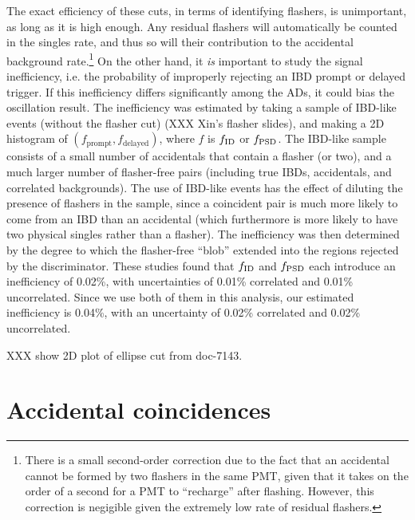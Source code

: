 \documentclass[../thesis.tex]{subfiles}
\begin{document}
The exact efficiency of these cuts, in terms of identifying flashers, is unimportant, as long as it is high enough. Any residual flashers will automatically be counted in the singles rate, and thus so will their contribution to the accidental background rate.\footnote{There is a small second-order correction due to the fact that an accidental cannot be formed by two flashers in the same PMT, given that it takes on the order of a second for a PMT to ``recharge'' after flashing. However, this correction is negigible given the extremely low rate of residual flashers.} On the other hand, it \emph{is} important to study the signal inefficiency, i.e. the probability of improperly rejecting an IBD prompt or delayed trigger. If this inefficiency differs significantly among the ADs, it could bias the oscillation result. The inefficiency was estimated by taking a sample of IBD-like events (without the flasher cut) (XXX Xin's flasher slides), and making a 2D histogram of $(f_{\mathrm{prompt}},f_{\mathrm{delayed}})$, where $f$ is $f_{\mathrm{ID}}$ or $f_{\mathrm{PSD}}$. The IBD-like sample consists of a small number of accidentals that contain a flasher (or two), and a much larger number of flasher-free pairs (including true IBDs, accidentals, and correlated backgrounds). The use of IBD-like events has the effect of diluting the presence of flashers in the sample, since a coincident pair is much more likely to come from an IBD than an accidental (which furthermore is more likely to have two physical singles rather than a flasher). The inefficiency was then determined by the degree to which the flasher-free ``blob'' extended into the regions rejected by the discriminator. These studies found that $f_{\mathrm{ID}}$ and $f_{\mathrm{PSD}}$ each introduce an inefficiency of 0.02\%, with uncertainties of 0.01\% correlated and 0.01\% uncorrelated. Since we use both of them in this analysis, our estimated inefficiency is 0.04\%, with an uncertainty of 0.02\% correlated and 0.02\% uncorrelated.

XXX show 2D plot of ellipse cut from doc-7143.

\section{Accidental coincidences}
\label{sec:accbkg}
\end{document}
